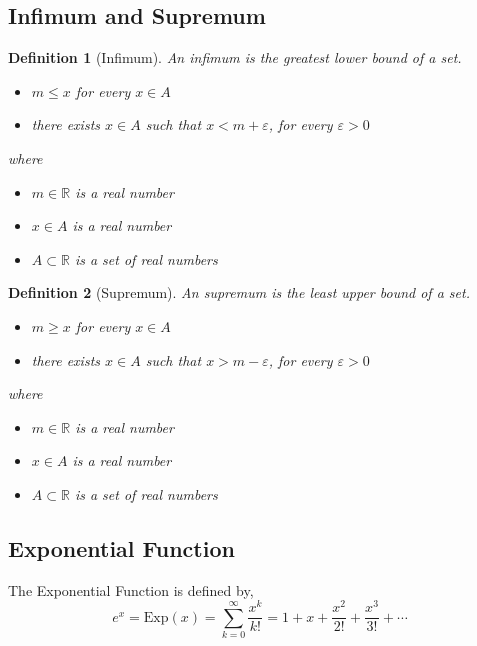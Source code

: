 \documentclass{article}
\newtheorem{definition}{Definition}
\begin{document}
\subsection{Infimum and Supremum}
\begin{mdframed}
\begin{definition}[Infimum]
An \emph{infimum} is the greatest lower bound of a set.

\begin{itemize}
    \item $m \leq x$ for every $x \in A$
    \item there exists $x \in A$ such that $x < m + \varepsilon$, for every $\varepsilon > 0$
\end{itemize}

where

\begin{itemize}
    \item $m \in \mathbb{R}$ is a real number
    \item $x \in A$ is a real number
    \item $A \subset \mathbb{R}$ is a set of real numbers
\end{itemize}
\end{definition}
\end{mdframed}

\begin{mdframed}
\begin{definition}[Supremum]
An \emph{supremum} is the least upper bound of a set.

\begin{itemize}
    \item $m \geq x$ for every $x \in A$
    \item there exists $x \in A$ such that $x > m - \varepsilon$, for every $\varepsilon > 0$
\end{itemize}

where

\begin{itemize}
    \item $m \in \mathbb{R}$ is a real number
    \item $x \in A$ is a real number
    \item $A \subset \mathbb{R}$ is a set of real numbers
\end{itemize}
\end{definition}
\end{mdframed}

\subsection{Exponential Function}
The Exponential Function is defined by,
$$
e^x = \text{Exp}(x) = \sum_{k=0}^{\infty} \frac{x^k}{k!} = 1 + x + \frac{x^2}{2!} + \frac{x^3}{3!} + \cdots
$$
\end{document}

